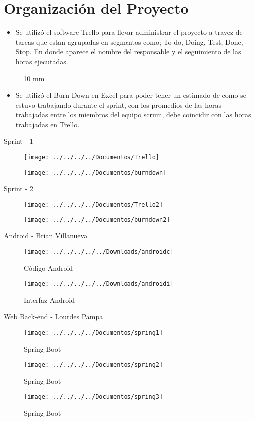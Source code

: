 \chapter{Organización del Proyecto}
\begin{itemize}
	\item Se utilizó el software Trello para llevar administrar el proyecto a travez de tareas que estan agrupadas en segmentos como; To do, Doing, Test, Done, Stop. En donde aparece el nombre del responsable y el seguimiento de las horas ejecutadas.
	\par
	\parskip = 10 mm
	\item Se utilizó el Burn Down en Excel para poder tener un estimado de como se estuvo trabajando durante el sprint, con los promedios de las horas trabajadas entre los miembros del equipo scrum, debe coincidir con las horas trabajadas en Trello.
\end{itemize} \par
{Sprint - 1}
\begin{figure}
	\texttt{[image: ../../../../Documentos/Trello]}
\end{figure}
\par
\begin{figure}
	\texttt{[image: ../../../../Documentos/burndown]}
\end{figure}

{Sprint - 2}
\begin{figure}
	\texttt{[image: ../../../../Documentos/Trello2]}
\end{figure}
\par
\begin{figure}
	\texttt{[image: ../../../../Documentos/burndown2]}
\end{figure}

{Android - Brian Villanueva}
\begin{figure}
	\centering
	\texttt{[image: ../../../../../Downloads/androidc]}
	\caption{Código Android}
	\label{Código Android}
\end{figure}
\par
\begin{figure}
	\centering
	\texttt{[image: ../../../../../Downloads/androidi]}
	\caption{Interfaz Android}
	\label{Interfaz Android}
\end{figure}
{Web Back-end - Lourdes Pampa}
\begin{figure}
	\centering
	\texttt{[image: ../../../../Documentos/spring1]}
	\caption{Spring Boot}
	\label{Spring Boot}
\end{figure}
\begin{figure}
	\centering
	\texttt{[image: ../../../../Documentos/spring2]}
	\caption{Spring Boot}
	\label{Spring Boot2}
\end{figure}
\begin{figure}
	\centering
	\texttt{[image: ../../../../Documentos/spring3]}
	\caption{Spring Boot}
	\label{Spring Boot3}
\end{figure}

